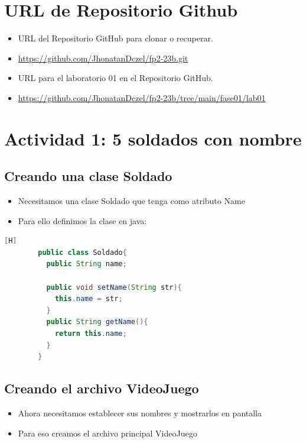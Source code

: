 \documentclass{article}
\begin{document}
	\section{URL de Repositorio Github}
	\begin{itemize}
		\item URL del Repositorio GitHub para clonar o recuperar.
		\item \url{https://github.com/JhonatanDczel/fp2-23b.git}
		\item URL para el laboratorio 01 en el Repositorio GitHub.
		\item \url{https://github.com/JhonatanDczel/fp2-23b/tree/main/fase01/lab01}
	\end{itemize}
	
	\section{Actividad 1: 5 soldados con nombre}
	
	\subsection{Creando una clase Soldado}
	\begin{itemize}	
		\item Necesitamos una clase Soldado que tenga como atributo Name
		\item Para ello definimos la clase en java:
	\end{itemize}	
		
	\begin{lstlisting}[language=java,caption={Clase Soldado}][H]
        public class Soldado{
          public String name;
        
          public void setName(String str){
            this.name = str;
          }
          public String getName(){
            return this.name;
          }
        }
	\end{lstlisting}
        \subsection{Creando el archivo VideoJuego}
        \begin{itemize}
            \item Ahora necesitamos establecer sus nombres y mostrarlos en pantalla
            \item Para eso creamos el archivo principal VideoJuego
        \end{itemize}
        
\end{document}
